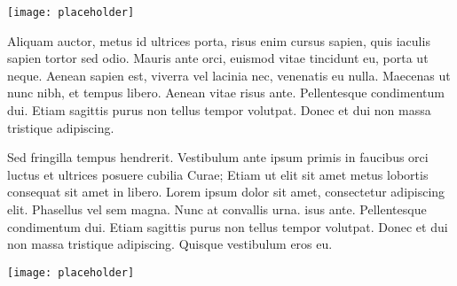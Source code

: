 \documentclass[landscape,a4paper,fontscale=1.2,margin=.25in]{styles/baposter}
\begin{document}
\begin{cheatsheet}
{\begin{multicols}{2}
\vspace{1em}
\begin{center}
\texttt{[image: placeholder]}
\end{center}

Aliquam auctor, metus id ultrices porta, risus enim cursus sapien, quis iaculis sapien tortor sed odio. Mauris ante orci, euismod vitae tincidunt eu, porta ut neque. Aenean sapien est, viverra vel lacinia nec, venenatis eu nulla. Maecenas ut nunc nibh, et tempus libero. Aenean vitae risus ante. Pellentesque condimentum dui. Etiam sagittis purus non tellus tempor volutpat. Donec et dui non massa tristique adipiscing.
\end{multicols}


\begin{multicols}{2}
\vspace{1em}
Sed fringilla tempus hendrerit. Vestibulum ante ipsum primis in faucibus orci luctus et ultrices posuere cubilia Curae; Etiam ut elit sit amet metus lobortis consequat sit amet in libero. Lorem ipsum dolor sit amet, consectetur adipiscing elit. Phasellus vel sem magna. Nunc at convallis urna. isus ante. Pellentesque condimentum dui. Etiam sagittis purus non tellus tempor volutpat. Donec et dui non massa tristique adipiscing. Quisque vestibulum eros eu.

\begin{center}
\texttt{[image: placeholder]}
\end{center}

\end{multicols}
}




\end{cheatsheet}
\end{document}
